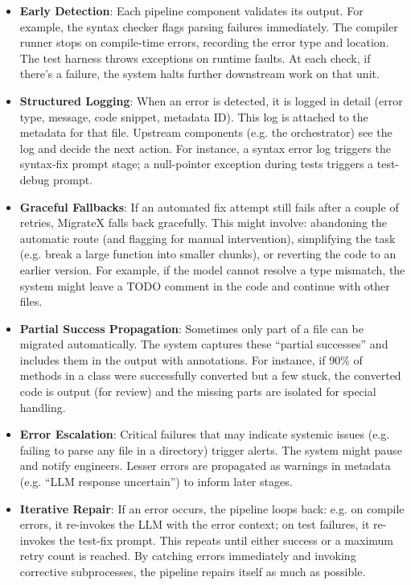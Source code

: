 \documentclass[twocolumn]{article}
\begin{document}
\begin{itemize}
    \item \textbf{Early Detection}: Each pipeline component validates its output. For example, the syntax checker flags parsing failures immediately. The compiler runner stops on compile-time errors, recording the error type and location. The test harness throws exceptions on runtime faults. At each check, if there’s a failure, the system halts further downstream work on that unit.
    
    \item \textbf{Structured Logging}: When an error is detected, it is logged in detail (error type, message, code snippet, metadata ID). This log is attached to the metadata for that file. Upstream components (e.g. the orchestrator) see the log and decide the next action. For instance, a syntax error log triggers the syntax-fix prompt stage; a null-pointer exception during tests triggers a test-debug prompt.

    \item \textbf{Graceful Fallbacks}: If an automated fix attempt still fails after a couple of retries, MigrateX falls back gracefully. This might involve: abandoning the automatic route (and flagging for manual intervention), simplifying the task (e.g. break a large function into smaller chunks), or reverting the code to an earlier version. For example, if the model cannot resolve a type mismatch, the system might leave a TODO comment in the code and continue with other files.

    \item \textbf{Partial Success Propagation}: Sometimes only part of a file can be migrated automatically. The system captures these ``partial successes'' and includes them in the output with annotations. For instance, if 90\% of methods in a class were successfully converted but a few stuck, the converted code is output (for review) and the missing parts are isolated for special handling.

    \item \textbf{Error Escalation}: Critical failures that may indicate systemic issues (e.g. failing to parse any file in a directory) trigger alerts. The system might pause and notify engineers. Lesser errors are propagated as warnings in metadata (e.g. ``LLM response uncertain'') to inform later stages.

    \item \textbf{Iterative Repair}: If an error occurs, the pipeline loops back: e.g. on compile errors, it re-invokes the LLM with the error context; on test failures, it re-invokes the test-fix prompt. This repeats until either success or a maximum retry count is reached. By catching errors immediately and invoking corrective subprocesses, the pipeline repairs itself as much as possible.


\end{itemize}
\end{document}
